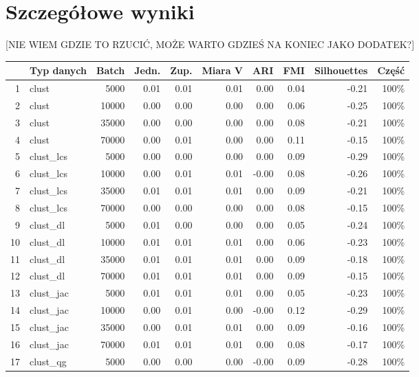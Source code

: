 \documentclass{praca1}
\begin{document}
\section{Szczegółowe wyniki}

[NIE WIEM GDZIE TO RZUCIĆ, MOŻE WARTO GDZIEŚ NA KONIEC JAKO DODATEK?]

\begin{table}[!h]
\centering
\begin{tabular}{|rlr|rrr|rr|r|r|}
  \hline
 & Typ danych & Batch & Jedn. & Zup. & Miara V & ARI & FMI & Silhouettes & Część \\ 
  \hline
1 & clust & 5000 & 0.01 & 0.01 & 0.01 & 0.00 & 0.04 & -0.21 & 100\% \\ 
  2 & clust & 10000 & 0.00 & 0.00 & 0.00 & 0.00 & 0.06 & -0.25 & 100\% \\ 
  3 & clust & 35000 & 0.00 & 0.00 & 0.00 & 0.00 & 0.08 & -0.21 & 100\% \\ 
  4 & clust & 70000 & 0.00 & 0.01 & 0.00 & 0.00 & 0.11 & -0.15 & 100\% \\ 
   \hline
5 & clust\_lcs & 5000 & 0.00 & 0.00 & 0.00 & 0.00 & 0.09 & -0.29 & 100\% \\ 
  6 & clust\_lcs & 10000 & 0.00 & 0.01 & 0.01 & -0.00 & 0.08 & -0.26 & 100\% \\ 
  7 & clust\_lcs & 35000 & 0.01 & 0.01 & 0.01 & 0.00 & 0.09 & -0.21 & 100\% \\ 
  8 & clust\_lcs & 70000 & 0.00 & 0.00 & 0.00 & 0.00 & 0.08 & -0.15 & 100\% \\ 
   \hline
9 & clust\_dl & 5000 & 0.01 & 0.00 & 0.00 & 0.00 & 0.05 & -0.24 & 100\% \\ 
  10 & clust\_dl & 10000 & 0.01 & 0.01 & 0.01 & 0.00 & 0.06 & -0.23 & 100\% \\ 
  11 & clust\_dl & 35000 & 0.01 & 0.01 & 0.01 & 0.00 & 0.09 & -0.18 & 100\% \\ 
  12 & clust\_dl & 70000 & 0.01 & 0.01 & 0.01 & 0.00 & 0.09 & -0.15 & 100\% \\ 
   \hline
13 & clust\_jac & 5000 & 0.01 & 0.01 & 0.01 & 0.00 & 0.05 & -0.23 & 100\% \\ 
  14 & clust\_jac & 10000 & 0.00 & 0.01 & 0.00 & -0.00 & 0.12 & -0.29 & 100\% \\ 
  15 & clust\_jac & 35000 & 0.00 & 0.01 & 0.01 & 0.00 & 0.09 & -0.16 & 100\% \\ 
  16 & clust\_jac & 70000 & 0.01 & 0.01 & 0.01 & 0.00 & 0.08 & -0.17 & 100\% \\ 
   \hline
17 & clust\_qg & 5000 & 0.00 & 0.00 & 0.00 & -0.00 & 0.09 & -0.28 & 100\% \\ 

\end{tabular}
\end{table}
\end{document}
